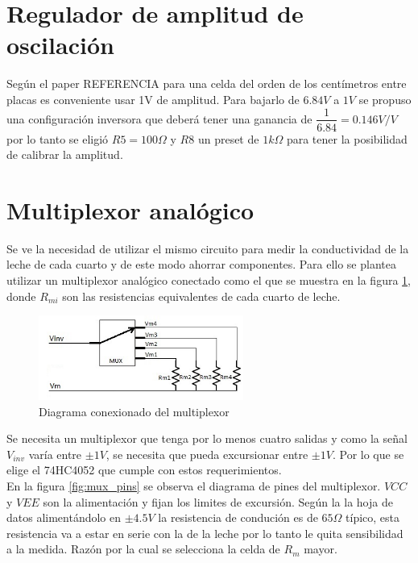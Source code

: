 \section{Regulador de amplitud de oscilación}
Según el paper REFERENCIA para una celda del orden de los centímetros entre placas es conveniente usar 1V de amplitud. Para bajarlo de $6.84V$ a $1V$ se propuso una configuración inversora que deberá tener una ganancia de $\dfrac{1}{6.84}=0.146 V/V$ por lo tanto se eligió  $R5=100\Omega$ y $R8$ un preset de $1k\Omega$ para tener la posibilidad de calibrar la amplitud.
\section{Multiplexor analógico}

Se ve la necesidad de utilizar el mismo circuito para medir la conductividad de la leche de cada cuarto y de este modo ahorrar componentes. Para ello se plantea utilizar un multiplexor analógico conectado como el que se muestra en la figura \ref{fig:mux}, donde $R_{mi}$ son las resistencias equivalentes de cada cuarto de leche.

\begin{figure}[H]
\centering
\includegraphics[width=0.6\textwidth]{mux/mux.jpg}
\caption{Diagrama conexionado del multiplexor}
\label{fig:mux}
\end{figure}

Se necesita un multiplexor que tenga por lo menos cuatro salidas y como la señal $V_{inv}$ varía entre $\pm 1V$, se necesita que pueda excursionar entre $\pm 1V$. Por lo que se elige el 74HC4052 que cumple con estos requerimientos.\\

En la figura \ref{fig:mux_pins} se observa el diagrama de pines del multiplexor. $VCC$ y $VEE$ son la alimentación y fijan los limites de excursión. Según la la hoja de datos alimentándolo en $\pm 4.5V$ la resistencia de condución es de $65\Omega$ típico, esta resistencia va a estar en serie con la de la leche por lo tanto le quita sensibilidad a la medida. Razón por la cual se selecciona la celda de $R_{m} $ mayor.\\

